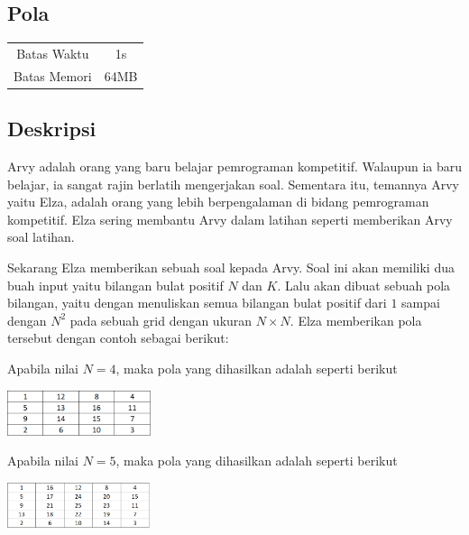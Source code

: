 \documentclass{article}
\begin{document}
\begin{center}
    \section*{Pola} %

    \begin{tabular}{ | c c | }
        \hline
        Batas Waktu  & 1s \\    %
        Batas Memori & 64MB \\  %
        \hline
    \end{tabular}
\end{center}

\subsection*{Deskripsi}

Arvy adalah orang yang baru belajar pemrograman kompetitif. Walaupun ia  baru belajar, ia sangat rajin berlatih
mengerjakan soal. Sementara itu, temannya Arvy yaitu Elza, adalah orang yang lebih berpengalaman di bidang pemrograman kompetitif. 
Elza sering membantu Arvy dalam latihan seperti memberikan Arvy soal latihan.

Sekarang Elza memberikan sebuah soal kepada Arvy. Soal ini akan memiliki dua buah input yaitu bilangan bulat positif $N$ dan $K$. 
Lalu akan dibuat sebuah pola bilangan, yaitu dengan menuliskan semua bilangan bulat positif dari $1$ sampai dengan $N^2$ pada sebuah 
grid dengan ukuran $N \times N$. Elza memberikan pola tersebut dengan contoh sebagai berikut:

Apabila nilai $N = 4$, maka pola yang dihasilkan adalah seperti berikut
\begin{center}
    \includegraphics[height=50px]{n=4}
\end{center}

Apabila nilai $N = 5$, maka pola yang dihasilkan adalah seperti berikut
\begin{center}
    \includegraphics[height=50px]{n=5}
\end{center}
\end{document}
